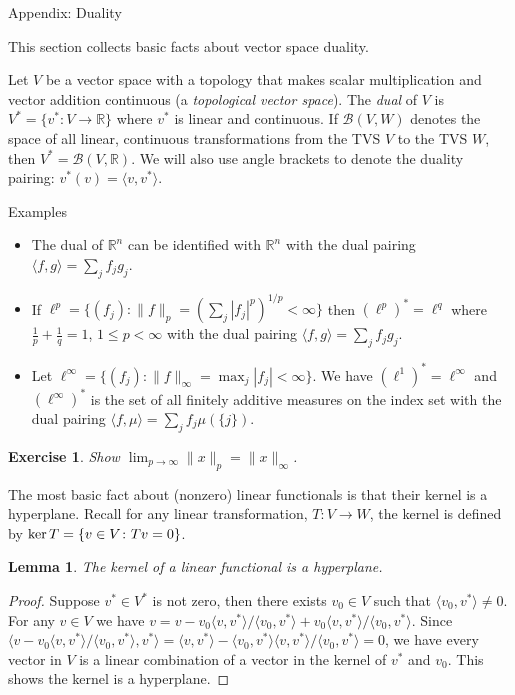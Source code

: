 \documentclass[fleqn]{amsart}
\def\ker{\mathop{\rm ker}}
\newcommand{\R}{\mathbb{R}}
\newcommand{\B}{\mathcal{B}}
\newtheorem{lemma}[theorem]{Lemma}
\newtheorem{exercise}{Exercise}
\begin{document}
\begin{section}{Appendix: Duality}

This section collects basic facts about vector space duality.

Let $V$ be a vector space with a topology that makes scalar multiplication
and vector addition continuous (a {\em topological vector space}).
The {\em dual} of $V$ is $V^* =
\{v^*\colon V\to\R\}$ where $v^*$ is linear and continuous. If $\B(V,W)$
denotes the space of all linear, continuous transformations from the TVS $V$ to
the TVS $W$, then $V^* = \B(V,\R)$.  We will also use angle brackets to denote
the duality pairing: $v^*(v) = \langle v,v^* \rangle$.

\begin{subsection}{Examples}
\begin{itemize}
\item The dual of $\R^n$ can be identified with $\R^n$ with
the dual pairing $\langle f,g\rangle = \sum_j f_j g_j$.
\item If $\ell^p = \{(f_j)\colon \|f\|_p = (\sum_j |f_j|^p)^{1/p} < \infty\}$
then $(\ell^p)^* = \ell^q$ where $\frac{1}{p} + \frac{1}{q} = 1$,
$1\le p < \infty$ with
the dual pairing $\langle f,g\rangle = \sum_j f_j g_j$.
\item Let $\ell^\infty = \{(f_j)\colon \|f\|_\infty = \max_j |f_j| < \infty\}$.
We have $(\ell^1)^* = \ell^\infty$ and $(\ell^\infty)^*$ is
the set of all finitely additive measures on the index set
with the dual pairing $\langle f,\mu \rangle = \sum_j f_j \mu(\{j\})$.
\end{itemize}
\end{subsection}

\begin{exercise}
Show $\lim_{p\to\infty}\|x\|_p = \|x\|_\infty$.
\end{exercise}

The most basic fact about (nonzero) linear functionals is that their
kernel is a hyperplane.  Recall for any linear transformation, $T\colon
V\to W$, the kernel is defined by $\ker T = \{v\in V\colon Tv = 0\}$.

\begin{lemma}
The kernel of a linear functional is a hyperplane.
\end{lemma}

\begin{proof}
Suppose $v^*\in V^*$ is not zero, then there exists $v_0\in V$ such
that $\langle v_0,v^*\rangle \not=0$. For any $v\in V$ we have $v
= v - v_0\langle v,v^*\rangle/\langle v_0,v^*\rangle + v_0\langle
v,v^*\rangle/\langle v_0,v^*\rangle$.  Since $\langle v - v_0\langle
v,v^*\rangle/\langle v_0,v^*\rangle, v^*\rangle = \langle v, v^*\rangle -
\langle v_0,v^*\rangle \langle v,v^*\rangle/\langle v_0,v^*\rangle = 0$,
we have every vector in $V$ is a linear combination of a vector in the
kernel of $v^*$ and $v_0$. This shows the kernel is a hyperplane.


\end{proof}
\end{section}
\end{document}
